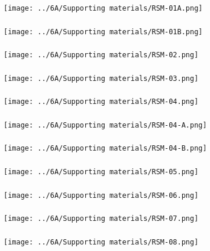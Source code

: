 \begin{frame}\frametitle{}
	\centerline{\texttt{[image: ../6A/Supporting materials/RSM-01A.png]}}
\end{frame}
\begin{frame}\frametitle{}
	\centerline{\texttt{[image: ../6A/Supporting materials/RSM-01B.png]}}
\end{frame}
\begin{frame}\frametitle{}
	\centerline{\texttt{[image: ../6A/Supporting materials/RSM-02.png]}}
\end{frame}
\begin{frame}\frametitle{}
	\centerline{\texttt{[image: ../6A/Supporting materials/RSM-03.png]}}
\end{frame}
\begin{frame}\frametitle{}
	\centerline{\texttt{[image: ../6A/Supporting materials/RSM-04.png]}}
\end{frame}
\begin{frame}\frametitle{}
	\centerline{\texttt{[image: ../6A/Supporting materials/RSM-04-A.png]}}
\end{frame}
\begin{frame}\frametitle{}
	\centerline{\texttt{[image: ../6A/Supporting materials/RSM-04-B.png]}}
\end{frame}
\begin{frame}\frametitle{}
	\centerline{\texttt{[image: ../6A/Supporting materials/RSM-05.png]}}
\end{frame}
\begin{frame}\frametitle{}
	\centerline{\texttt{[image: ../6A/Supporting materials/RSM-06.png]}}
\end{frame}
\begin{frame}\frametitle{}
	\centerline{\texttt{[image: ../6A/Supporting materials/RSM-07.png]}}
\end{frame}
\begin{frame}\frametitle{}
	\centerline{\texttt{[image: ../6A/Supporting materials/RSM-08.png]}}
\end{frame}

